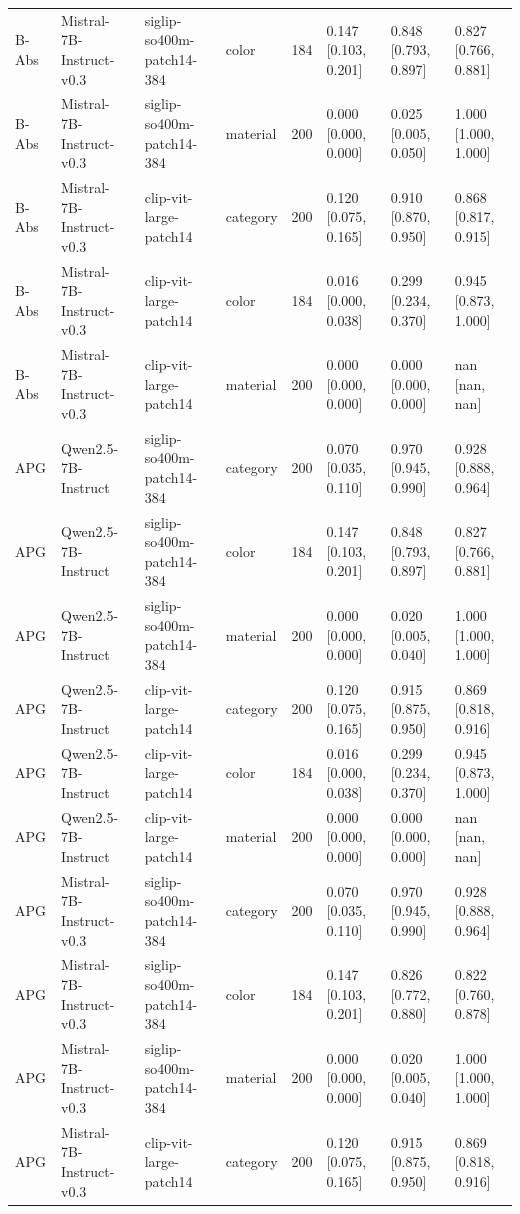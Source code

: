 \begin{tabular}{llllrlll}
B-Abs & Mistral-7B-Instruct-v0.3 & siglip-so400m-patch14-384 & color & 184 & 0.147 [0.103, 0.201] & 0.848 [0.793, 0.897] & 0.827 [0.766, 0.881] \\
B-Abs & Mistral-7B-Instruct-v0.3 & siglip-so400m-patch14-384 & material & 200 & 0.000 [0.000, 0.000] & 0.025 [0.005, 0.050] & 1.000 [1.000, 1.000] \\
B-Abs & Mistral-7B-Instruct-v0.3 & clip-vit-large-patch14 & category & 200 & 0.120 [0.075, 0.165] & 0.910 [0.870, 0.950] & 0.868 [0.817, 0.915] \\
B-Abs & Mistral-7B-Instruct-v0.3 & clip-vit-large-patch14 & color & 184 & 0.016 [0.000, 0.038] & 0.299 [0.234, 0.370] & 0.945 [0.873, 1.000] \\
B-Abs & Mistral-7B-Instruct-v0.3 & clip-vit-large-patch14 & material & 200 & 0.000 [0.000, 0.000] & 0.000 [0.000, 0.000] & nan [nan, nan] \\
APG & Qwen2.5-7B-Instruct & siglip-so400m-patch14-384 & category & 200 & 0.070 [0.035, 0.110] & 0.970 [0.945, 0.990] & 0.928 [0.888, 0.964] \\
APG & Qwen2.5-7B-Instruct & siglip-so400m-patch14-384 & color & 184 & 0.147 [0.103, 0.201] & 0.848 [0.793, 0.897] & 0.827 [0.766, 0.881] \\
APG & Qwen2.5-7B-Instruct & siglip-so400m-patch14-384 & material & 200 & 0.000 [0.000, 0.000] & 0.020 [0.005, 0.040] & 1.000 [1.000, 1.000] \\
APG & Qwen2.5-7B-Instruct & clip-vit-large-patch14 & category & 200 & 0.120 [0.075, 0.165] & 0.915 [0.875, 0.950] & 0.869 [0.818, 0.916] \\
APG & Qwen2.5-7B-Instruct & clip-vit-large-patch14 & color & 184 & 0.016 [0.000, 0.038] & 0.299 [0.234, 0.370] & 0.945 [0.873, 1.000] \\
APG & Qwen2.5-7B-Instruct & clip-vit-large-patch14 & material & 200 & 0.000 [0.000, 0.000] & 0.000 [0.000, 0.000] & nan [nan, nan] \\
APG & Mistral-7B-Instruct-v0.3 & siglip-so400m-patch14-384 & category & 200 & 0.070 [0.035, 0.110] & 0.970 [0.945, 0.990] & 0.928 [0.888, 0.964] \\
APG & Mistral-7B-Instruct-v0.3 & siglip-so400m-patch14-384 & color & 184 & 0.147 [0.103, 0.201] & 0.826 [0.772, 0.880] & 0.822 [0.760, 0.878] \\
APG & Mistral-7B-Instruct-v0.3 & siglip-so400m-patch14-384 & material & 200 & 0.000 [0.000, 0.000] & 0.020 [0.005, 0.040] & 1.000 [1.000, 1.000] \\
APG & Mistral-7B-Instruct-v0.3 & clip-vit-large-patch14 & category & 200 & 0.120 [0.075, 0.165] & 0.915 [0.875, 0.950] & 0.869 [0.818, 0.916] \\

\end{tabular}
